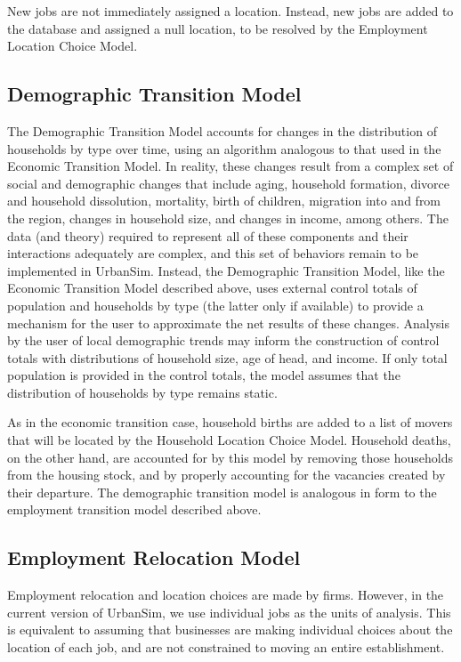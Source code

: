 New jobs are not immediately assigned a location.  Instead, new
jobs are added to the database and assigned a null location, to be
resolved by the Employment Location Choice Model.


\subsection{Demographic Transition Model}

The Demographic Transition Model accounts for changes in the
distribution of households by type over time, using an algorithm
analogous to that used in the Economic Transition Model.  In
reality, these changes result from a complex set of social and
demographic changes that include aging, household formation,
divorce and household dissolution, mortality, birth of children,
migration into and from the region, changes in household size, and
changes in income, among others.  The data (and theory) required
to represent all of these components and their interactions
adequately are complex, and this set of behaviors remain to be
implemented in UrbanSim. Instead, the Demographic
Transition Model, like the Economic Transition Model described
above, uses external control totals of population and households
by type (the latter only if available) to provide a mechanism for
the user to approximate the net results of these changes. Analysis
by the user of local demographic trends may inform the
construction of control totals with distributions of household
size, age of head, and income.  If only total population is
provided in the control totals, the model assumes that the
distribution of households by type remains static.

As in the economic transition case, household births are added to
a list of movers that will be located by the Household Location
Choice Model.  Household deaths, on the other hand, are accounted
for by this model by removing those households from the housing
stock, and by properly accounting for the vacancies created by
their departure.  The demographic transition model is analogous in
form to the employment transition model described above.


\subsection{Employment Relocation Model}

Employment relocation and location choices are made by firms.
However, in the current version of UrbanSim, we use individual
jobs as the units of analysis.  This is equivalent to assuming
that businesses are making individual choices about the location
of each job, and are not constrained to moving an entire
establishment.

